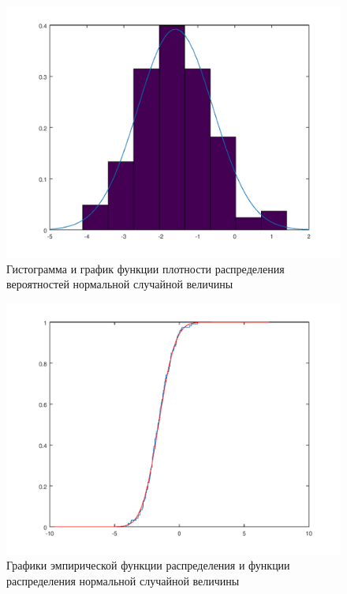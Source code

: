 \documentclass[a4paper,11pt,russian]{extreport}
\begin{document}
	\begin{figure}
		\includegraphics[width=\linewidth]{../img/1.png}
		\caption{Гистограмма и график функции плотности распределения вероятностей нормальной случайной величины}
		\label{fig:1}
	\end{figure}
	
	\begin{figure}
		\includegraphics[width=\linewidth]{../img/2.png}
		\caption{Графики эмпирической функции распределения и функции распределения нормальной случайной величины}
		\label{fig:2}
	\end{figure}
	
		
	
\end{document}
